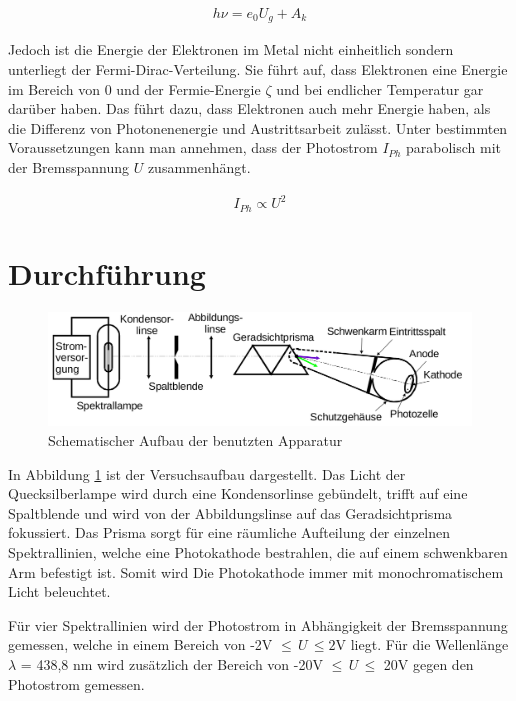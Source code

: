 \begin{align}
 h\nu = e_0 U_g + A_k
 \label{eq_photoerweitert}
\end{align}

Jedoch ist die Energie der Elektronen im Metal nicht einheitlich sondern unterliegt der Fermi-Dirac-Verteilung. Sie führt auf, dass
Elektronen eine Energie im Bereich von 0 und der Fermie-Energie $\zeta$ und bei endlicher Temperatur gar darüber haben. Das führt dazu,
dass Elektronen auch mehr Energie haben, als die Differenz von Photonenenergie und Austrittsarbeit zulässt. Unter bestimmten 
Voraussetzungen kann man annehmen, dass der Photostrom $I_{Ph}$ parabolisch mit der Bremsspannung $U$ zusammenhängt. 

\begin{align}
 I_{Ph} \propto U^2
 \label{eq_stromspannung}
\end{align}

\section{Durchführung}
\begin{figure}[H]
 \includegraphics[width=\textwidth]{pics/Aufbau.png}
 \caption{Schematischer Aufbau der benutzten Apparatur}
 \label{pic_aufbau}
\end{figure}

In Abbildung \ref{pic_aufbau} ist der Versuchsaufbau dargestellt. Das Licht der Quecksilberlampe wird durch eine Kondensorlinse gebündelt,
trifft auf eine Spaltblende und wird von der Abbildungslinse auf das Geradsichtprisma fokussiert. Das Prisma sorgt für eine räumliche
Aufteilung der einzelnen Spektrallinien, welche eine Photokathode bestrahlen, die auf einem schwenkbaren Arm befestigt ist. Somit wird
Die Photokathode immer mit monochromatischem Licht beleuchtet. 

Für vier Spektrallinien wird der Photostrom in Abhängigkeit der Bremsspannung gemessen, welche in einem Bereich von -2V $\leq \,U \, \leq 2$V
liegt. Für die Wellenlänge $\lambda$ = 438,8 nm wird zusätzlich der Bereich von -20V $\leq \,U \, \leq$ 20V gegen den Photostrom gemessen.


